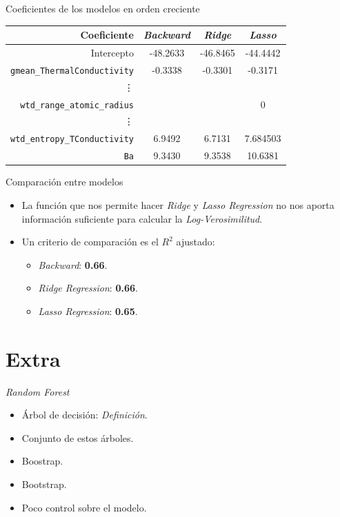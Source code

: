 \documentclass[11pt]{beamer}
\newcommand{\cod}[1]{\texttt{\frenchspacing#1}}
\begin{document}
\begin{frame}{Coeficientes de los modelos en orden creciente}
	\begin{center}
		\begin{tabular}{|r|c|c|c|}
			\hline
			Coeficiente & \textit{Backward}& \textit{Ridge} & \textit{Lasso} \\
			\hline
			Intercepto  &-48.2633 &-46.8465 &-44.4442 \\
			\cod{gmean\_ThermalConductivity} & -0.3338 & -0.3301 & -0.3171 \\
			\vdots & & & \\
			\cod{wtd\_range\_atomic\_radius} &  &  & 0\\
			\vdots & & & \\
			\cod{wtd\_entropy\_TConductivity}& 6.9492 & 6.7131 & 7.684503 \\
			\cod{Ba} & 9.3430 & 9.3538 & 10.6381 \\
			\hline
		\end{tabular}
	\end{center}
\end{frame}

\begin{frame}{Comparación entre modelos}
	\begin{itemize}
		\item La función que nos permite hacer \textit{Ridge} y \textit{Lasso Regression} no nos aporta información suficiente para calcular la \textit{Log-Verosimilitud}.
		\pause
		\item Un criterio de comparación es el $R^2$ ajustado:
		\pause
		\begin{itemize}
			\item \textit{Backward}: \textbf{0.66}.
			\item \textit{Ridge Regression}: \textbf{0.66}.
			\item \textit{Lasso Regression}: \textbf{0.65}.
		\end{itemize}
	\end{itemize}
\end{frame}


\section{Extra}

\begin{frame}{\textit{Random Forest}}
	\begin{itemize}
		\item Árbol de decisión: \textit{Definición}.
		\pause
		\item Conjunto de estos árboles.
		\pause
		\item Boostrap.
		\pause
		\item Bootstrap.
		\pause
		\item Poco control sobre el modelo.
	\end{itemize}
\end{frame}
\end{document}
